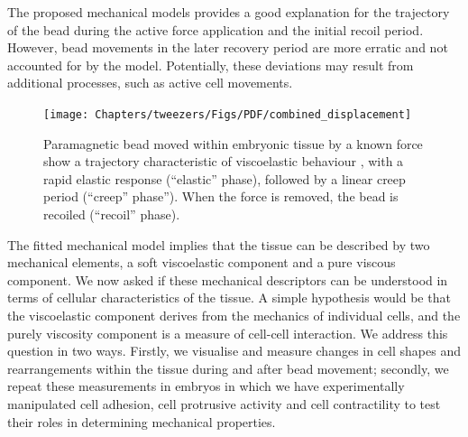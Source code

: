 The proposed mechanical models provides a good explanation for the trajectory of the bead during the active force application and the initial recoil period.
However, bead movements in the later recovery period are more erratic and not accounted for by the model.
Potentially, these deviations may result from additional processes, such as active cell movements.

\begin{figure}
  \centering
  \texttt{[image: Chapters/tweezers/Figs/PDF/combined\_displacement]}
  \caption{Paramagnetic bead moved within embryonic tissue by a known force show a trajectory characteristic of viscoelastic behaviour , with a rapid elastic response (“elastic” phase), followed by a linear creep period (“creep” phase”).
  When the force is removed, the bead is recoiled (“recoil” phase).
  }
\end{figure}

The fitted mechanical model implies that the tissue can be described by two mechanical elements, a soft viscoelastic component and a pure viscous component.
 We now asked if these mechanical descriptors can be understood in terms of cellular characteristics of the tissue.
 A simple hypothesis would be that the viscoelastic component derives from the mechanics of individual cells, and the purely viscosity component is a measure of cell-cell interaction.
 We address this question in two ways.
 Firstly, we visualise and measure changes in cell shapes and rearrangements within the tissue during and after bead movement; secondly, we repeat these measurements in embryos in which we have experimentally manipulated cell adhesion, cell protrusive activity and cell contractility to test their roles in determining mechanical properties.




